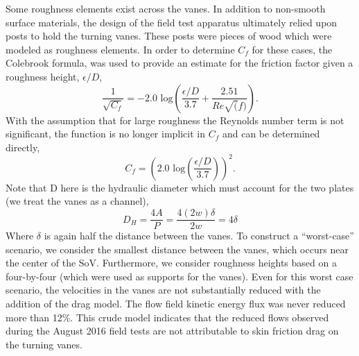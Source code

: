 %
%

Some roughness elements exist across the vanes. In addition to
non-smooth surface materials, the design of the field test apparatus
ultimately relied upon posts to hold the turning vanes. These posts were
pieces of wood which were modeled as roughness elements. In order to
determine $C_f$ for these cases, the Colebrook formula\cite{Colebrook367},
was used to provide an estimate for the friction factor given a
roughness height, $\epsilon/D$,  
\begin{equation}
 \frac{1}{\sqrt{C_f}} = -2.0 \text{ log}\left(\frac{\epsilon/D}{3.7} + \frac{2.51}{Re\sqrt(f)}\right).
\end{equation}
 With the assumption that for large roughness the Reynolds number term
 is not significant, the function is no longer implicit in $C_f$ and can
 be determined directly,  
\begin{equation}
 C_f = \left(2.0 \text{ log}\left(\frac{\epsilon/D}{3.7}\right)\right)^2. 
\end{equation}
Note that D here is the hydraulic diameter which must account for the
two plates (we treat the vanes as a channel),
\begin{equation}
D_H = \frac{4 A}{P} = \frac{4 (2w)\delta}{2w} = 4 \delta
\end{equation}
Where $\delta$ is again half the distance between the vanes. 
To construct a ``worst-case'' scenario, we consider
the smallest distance between the vanes, which occurs near the center of
the SoV. Furthermore, we consider roughness heights based on a
four-by-four (which were used as supports for the
vanes). Even for this worst case scenario, the velocities in the vanes
are not substantially reduced with the addition of the drag model. The
flow field kinetic energy flux was never reduced more than 12\%. 
This crude model indicates that the reduced flows observed during the
August 2016 field tests are not attributable to skin friction drag on the
turning vanes.  


